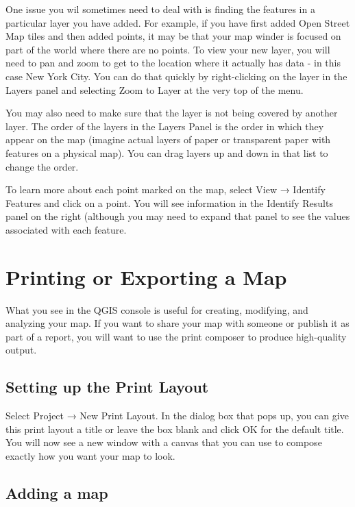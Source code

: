 \documentclass[]{book}
\begin{document}
One issue you wil sometimes need to deal with is finding the features in a particular layer you have added. For example, if you have first added Open Street Map tiles and then added points, it may be that your map winder is focused on part of the world where there are no points. To view your new layer, you will need to pan and zoom to get to the location where it actually has data - in this case New York City. You can do that quickly by right-clicking on the layer in the Layers panel and selecting Zoom to Layer at the very top of the menu.

You may also need to make sure that the layer is not being covered by another layer. The order of the layers in the Layers Panel is the order in which they appear on the map (imagine actual layers of paper or transparent paper with features on a physical map). You can drag layers up and down in that list to change the order.

To learn more about each point marked on the map, select View → Identify Features and click on a point. You will see information in the Identify Results panel on the right (although you may need to expand that panel to see the values associated with each feature.

\hypertarget{printing-or-exporting-a-map}{%
\section{Printing or Exporting a Map}\label{printing-or-exporting-a-map}}

What you see in the QGIS console is useful for creating, modifying, and analyzing your map. If you want to share your map with someone or publish it as part of a report, you will want to use the print composer to produce high-quality output.

\hypertarget{setting-up-the-print-layout}{%
\subsection{Setting up the Print Layout}\label{setting-up-the-print-layout}}

Select Project → New Print Layout. In the dialog box that pops up, you can give this print layout a title or leave the box blank and click OK for the default title. You will now see a new window with a canvas that you can use to compose exactly how you want your map to look.

\hypertarget{adding-a-map}{%
\subsection{Adding a map}\label{adding-a-map}}
\end{document}
